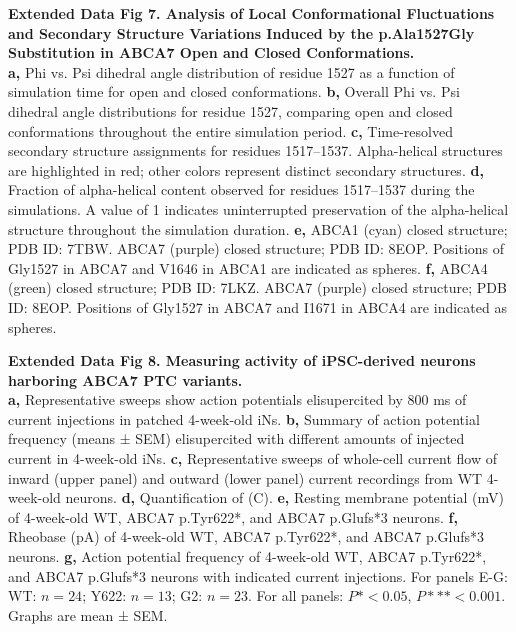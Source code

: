 \textbf{Extended Data Fig 7. Analysis of Local Conformational Fluctuations and Secondary Structure Variations Induced by the p.Ala1527Gly Substitution in ABCA7 Open and Closed Conformations.}\\
\textbf{a,} Phi vs. Psi dihedral angle distribution of residue 1527 as a function of simulation time for open and closed conformations.
\textbf{b,} Overall Phi vs. Psi dihedral angle distributions for residue 1527, comparing open and closed conformations throughout the entire simulation period.
\textbf{c,} Time-resolved secondary structure assignments for residues 1517–1537. Alpha-helical structures are highlighted in red; other colors represent distinct secondary structures.
\textbf{d,} Fraction of alpha-helical content observed for residues 1517–1537 during the simulations. A value of 1 indicates uninterrupted preservation of the alpha-helical structure throughout the simulation duration.
\textbf{e,} ABCA1 (cyan) closed structure; PDB ID: 7TBW. ABCA7 (purple) closed structure; PDB ID: 8EOP. Positions of Gly1527 in ABCA7 and V1646 in ABCA1 are indicated as spheres.
\textbf{f,} ABCA4 (green) closed structure; PDB ID: 7LKZ. ABCA7 (purple) closed structure; PDB ID: 8EOP. Positions of Gly1527 in ABCA7 and I1671 in ABCA4 are indicated as spheres.

\textbf{Extended Data Fig 8. Measuring activity of iPSC-derived neurons harboring ABCA7 PTC variants.}\\
\textbf{a,} Representative sweeps show action potentials elisupercited by 800 ms of current injections in patched 4-week-old iNs.
\textbf{b,} Summary of action potential frequency (means ± SEM) elisupercited with different amounts of injected current in 4-week-old iNs. 
\textbf{c,} Representative sweeps of whole-cell current flow of inward (upper panel) and outward (lower panel) current recordings from WT 4-week-old neurons. 
\textbf{d,} Quantification of (C). 
\textbf{e,} Resting membrane potential (mV) of 4-week-old WT, ABCA7 p.Tyr622*, and ABCA7 p.Glufs*3 neurons. 
\textbf{f,} Rheobase (pA) of 4-week-old WT, ABCA7 p.Tyr622*, and ABCA7 p.Glufs*3 neurons. 
\textbf{g,} Action potential frequency of 4-week-old WT, ABCA7 p.Tyr622*, and ABCA7 p.Glufs*3 neurons with indicated current injections. For panels E-G: WT: $n=24$; Y622: $n=13$; G2: $n=23$. For all panels: $P*<0.05$, $P***<0.001$. Graphs are mean ± SEM.

